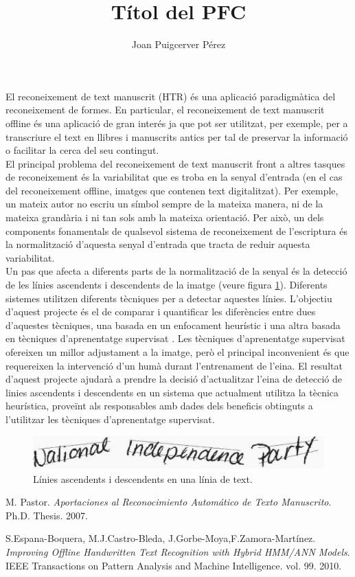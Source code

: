 \documentclass[a4paper]{article}
\author{Joan Puigcerver Pérez}
\title{Títol del PFC}
\begin{document}
\maketitle

El reconeixement de text manuscrit (HTR) és una aplicació paradigmàtica del reconeixement de formes. En particular, el reconeixement de text manuscrit offline és una aplicació de gran interés ja que pot ser utilitzat, per exemple, per a transcriure el text en llibres i manuscrits antics per tal de preservar la informació o facilitar la cerca del seu contingut. \\

El principal problema del reconeixement de text manuscrit front a altres tasques de reconeixement és la variabilitat que es troba en la senyal d'entrada (en el cas del reconeixement offline, imatges que contenen text digitalitzat). Per exemple, un mateix autor no escriu un símbol sempre de la mateixa manera, ni de la mateixa grandària i ni tan sols amb la mateixa orientació. Per això, un dels components fonamentals de qualsevol sistema de reconeixement de l'escriptura és la normalització d'aquesta senyal d'entrada que tracta de reduir aquesta variabilitat. \\

Un pas que afecta a diferents parts de la normalització de la senyal és la detecció de les línies ascendents i descendents de la imatge (veure figura \ref{fig:adlines}). Diferents sistemes utilitzen diferents tècniques per a detectar aquestes línies. L'objectiu d'aquest projecte és el de comparar i quantificar les diferències entre dues d'aquestes tècniques, una basada en un enfocament heurístic \cite{Pastor07} i una altra basada en tècniques d'aprenentatge supervisat \cite{Espana10}. Les tècniques d'aprenentatge supervisat ofereixen un millor adjustament a la imatge, però el principal inconvenient és que requereixen la intervenció d'un humà durant l'entrenament de l'eina. El resultat d'aquest projecte ajudarà a prendre la decisió d'actualitzar l'eina de detecció de linies ascendents i descendents en un sistema que actualment utilitza la tècnica heurística, proveïnt als responsables amb dades dels beneficis obtinguts a l'utilitzar les tècniques d'aprenentatge supervisat.

\begin{figure}
\label{fig:adlines}
\includegraphics[width=\textwidth]{a01-011x-01_final}
\caption{Línies ascendents i descendents en una línia de text.}
\end{figure}

\begin{thebibliography}{9}
 M. Pastor. \emph{Aportaciones al Reconocimiento Automático de Texto Manuscrito}. Ph.D. Thesis. 2007.

 S.Espana-Boquera, M.J.Castro-Bleda, J.Gorbe-Moya,F.Zamora-Martínez. \emph{Improving Offline Handwritten Text Recognition with Hybrid HMM/ANN Models}. IEEE Transactions on Pattern Analysis and Machine Intelligence. vol. 99. 2010.
\end{thebibliography}
\end{document}
